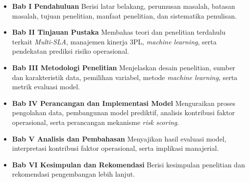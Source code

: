 \begin{itemize}
    \item \textbf{Bab I Pendahuluan}  
    Berisi latar belakang, perumusan masalah, batasan masalah, tujuan penelitian, manfaat penelitian, dan sistematika penulisan.

    \item \textbf{Bab II Tinjauan Pustaka}  
    Membahas teori dan penelitian terdahulu terkait \textit{Multi-SLA}, manajemen kinerja 3PL, \textit{machine learning}, serta pendekatan prediksi risiko operasional.

    \item \textbf{Bab III Metodologi Penelitian}  
    Menjelaskan desain penelitian, sumber dan karakteristik data, pemilihan variabel, metode \textit{machine learning}, serta metrik evaluasi model.

    \item \textbf{Bab IV Perancangan dan Implementasi Model}  
    Menguraikan proses pengolahan data, pembangunan model prediktif, analisis kontribusi faktor operasional, serta perancangan mekanisme \textit{risk scoring}.

    \item \textbf{Bab V Analisis dan Pembahasan}  
    Menyajikan hasil evaluasi model, interpretasi kontribusi faktor operasional, serta implikasi manajerial.

    \item \textbf{Bab VI Kesimpulan dan Rekomendasi}  
    Berisi kesimpulan penelitian dan rekomendasi pengembangan lebih lanjut.
\end{itemize}